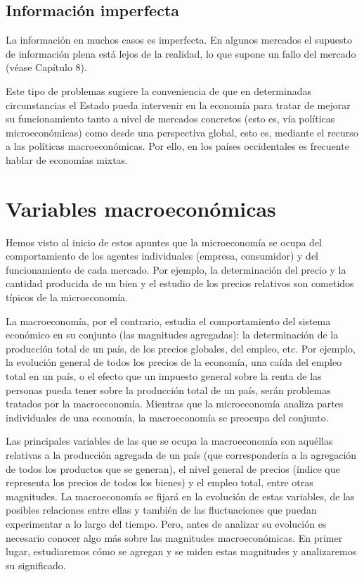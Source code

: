 \documentclass[
]{krantz}
\begin{document}
\hypertarget{informaciuxf3n-imperfecta}{%
\section{Información imperfecta}\label{informaciuxf3n-imperfecta}}

La información en muchos casos es imperfecta. En algunos mercados el supuesto de información plena está lejos de la realidad, lo que supone un fallo del mercado (véase Capítulo 8).

Este tipo de problemas sugiere la conveniencia de que en determinadas circunstancias el Estado pueda intervenir en la economía para tratar de mejorar su funcionamiento tanto a nivel de mercados concretos (esto es, vía políticas microeconómicas) como desde una perspectiva global, esto es, mediante el recurso a las políticas macroeconómicas. Por ello, en los países occidentales es frecuente hablar de economías mixtas.

\hypertarget{variables-macroeconuxf3micas}{%
\chapter{Variables macroeconómicas}\label{variables-macroeconuxf3micas}}

Hemos visto al inicio de estos apuntes que la microeconomía se ocupa del comportamiento de los agentes individuales (empresa, consumidor) y del funcionamiento de cada mercado. Por ejemplo, la determinación del precio y la cantidad producida de un bien y el estudio de los precios relativos son cometidos típicos de la microeconomía.

La macroeconomía, por el contrario, estudia el comportamiento del sistema económico en su conjunto (las magnitudes agregadas): la determinación de la producción total de un país, de los precios globales, del empleo, etc. Por ejemplo, la evolución general de todos los precios de la economía, una caída del empleo total en un país, o el efecto que un impuesto general sobre la renta de las personas pueda tener sobre la producción total de un país, serán problemas tratados por la macroeconomía. Mientras que la microeconomía analiza partes individuales de una economía, la macroeconomía se preocupa del conjunto.

Las principales variables de las que se ocupa la macroeconomía son aquéllas relativas a la producción agregada de un país (que correspondería a la agregación de todos los productos que se generan), el nivel general de precios (índice que representa los precios de todos los bienes) y el empleo total, entre otras magnitudes. La macroeconomía se fijará en la evolución de estas variables, de las posibles relaciones entre ellas y también de las fluctuaciones que puedan experimentar a lo largo del tiempo. Pero, antes de analizar su evolución es necesario conocer algo más sobre las magnitudes macroeconómicas. En primer lugar, estudiaremos cómo se agregan y se miden estas magnitudes y analizaremos su significado.
\end{document}
